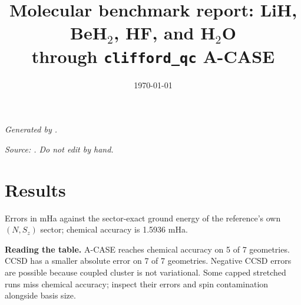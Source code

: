 \documentclass[11pt]{article}
\title{Molecular benchmark report: LiH, BeH$_2$, HF, and H$_2$O\\ through \texttt{clifford\_qc} A-CASE}
\date{\today}
\begin{document}
\maketitle

\noindent\emph{Generated by .}\par\noindent\emph{Source: . Do not edit by hand.}

\section{Results}

Errors in mHa against the sector-exact ground energy of the reference's own $(N, S_z)$ sector; chemical accuracy is 1.5936 mHa.

\begin{table}[h]
\centering
\caption{Adaptive A-CASE against classical baselines.}
\end{table}

\noindent\textbf{Reading the table.} A-CASE reaches chemical accuracy on 5 of 7 geometries. CCSD has a smaller absolute error on 7 of 7 geometries. Negative CCSD errors are possible because coupled cluster is not variational. Some capped stretched runs miss chemical accuracy; inspect their errors and spin contamination alongside basis size.
\end{document}
